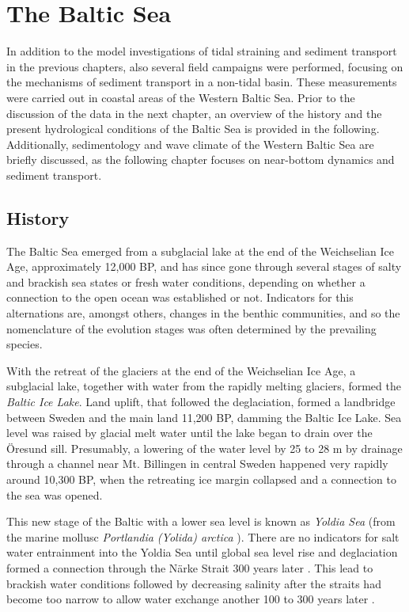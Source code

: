 \chapter{The Baltic Sea}
\label{kap-einleitung}

In addition to the model investigations of tidal straining and sediment 
transport in the previous chapters, also several field campaigns were 
performed, focusing on the mechanisms of sediment transport in a non-tidal 
basin. These measurements were carried out in 
coastal areas of the Western Baltic Sea. Prior to the 
discussion of the data in the next chapter, an overview of the history 
and the present hydrological conditions of the Baltic Sea is provided in 
the following. Additionally, sedimentology and wave climate of the 
Western Baltic Sea 
are briefly discussed, as the following chapter focuses on near-bottom dynamics 
and sediment transport.

\section{History}

The Baltic Sea emerged from a subglacial lake at the end of the Weichselian Ice 
Age, approximately 12,000 BP, and has since gone through several stages of 
salty and brackish sea states or fresh water conditions, depending on whether a 
connection to the open ocean was established or not. Indicators for this 
alternations are, amongst others, changes in the benthic communities, and so the 
nomenclature of the evolution stages was often determined by the prevailing 
species.

With the retreat of the glaciers at the end of the Weichselian Ice Age, a 
subglacial lake, together with water from the rapidly melting glaciers, formed 
the \textit{Baltic Ice Lake}. Land uplift, that followed the deglaciation, 
formed a landbridge between Sweden and the main land 11,200 BP, damming the 
Baltic Ice Lake. Sea level was raised by glacial melt water until the lake began 
to drain over the Öresund sill. Presumably, a lowering of the water level by 25 
to 28 m by drainage through a channel near Mt. Billingen in central Sweden 
happened very rapidly around 10,300 BP, when the retreating ice margin collapsed 
\citep[][]{bjoerk95,tikkanen2002} and a connection to the sea was opened. 

This new stage of the Baltic with a lower sea level is known as \textit{Yoldia 
Sea} (from the marine mollusc \textit{Portlandia (Yolida) arctica} 
\citep[][]{schoning2001}). There are no indicators for salt water entrainment 
into the Yoldia Sea until global sea level rise and deglaciation formed a 
connection through the Närke Strait 300 years later \citep[][]{schoning2001}. 
This lead to brackish water conditions followed by decreasing salinity after the 
straits had become too narrow to allow water exchange another 100 to 300 years 
later \citep[][]{bjoerk95}.

